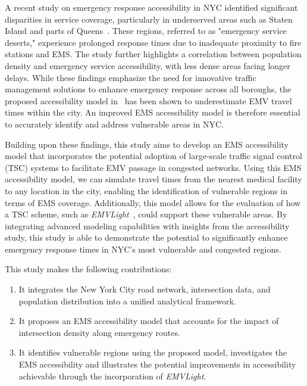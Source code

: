 A recent study on emergency response accessibility in NYC identified significant disparities in service coverage, particularly in underserved areas such as Staten Island and parts of Queens~\cite{chung2024access}. These regions, referred to as "emergency service deserts," experience prolonged response times due to inadequate proximity to fire stations and EMS. The study further highlights a correlation between population density and emergency service accessibility, with less dense areas facing longer delays. While these findings emphasize the need for innovative traffic management solutions to enhance emergency response across all boroughs, the proposed accessibility model in~\cite{chung2024access} has been shown to underestimate EMV travel times within the city. An improved EMS accessibility model is therefore essential to accurately identify and address vulnerable areas in NYC.

Building upon these findings, this study aims to develop an EMS accessibility model that incorporates the potential adoption of large-scale traffic signal control (TSC) systems to facilitate EMV passage in congested networks. Using this EMS accessibility model, we can simulate travel times from the nearest medical facility to any location in the city, enabling the identification of vulnerable regions in terms of EMS coverage. Additionally, this model allows for the evaluation of how a TSC scheme, such as \textit{EMVLight}~\cite{su2023emvlight}, could support these vulnerable areas. By integrating advanced modeling capabilities with insights from the accessibility study, this study is able to demonstrate the potential to significantly enhance emergency response times in NYC’s most vulnerable and congested regions.


This study makes the following contributions:
\begin{enumerate}
    \item It integrates the New York City road network, intersection data, and population distribution into a unified analytical framework.
    \item It proposes an EMS accessibility model that accounts for the impact of intersection density along emergency routes.
    \item It identifies vulnerable regions using the proposed model, investigates the EMS accessibility and illustrates the potential improvements in accessibility achievable through the incorporation of \textit{EMVLight}.
\end{enumerate}

